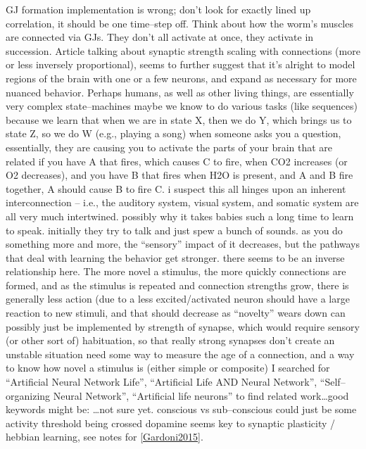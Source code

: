 \documentclass[11pt, a4paper, oneside]{article}   	%
\begin{document}
\begin{outline}
\point GJ formation implementation is wrong; don't look for exactly lined up correlation, it should be one time--step off. Think about how the worm's muscles are connected via GJs. They don't all activate at once, they activate in succession.
\point Article talking about synaptic strength scaling with connections (more or less inversely proportional), seems to further suggest that it's alright to model regions of the brain with one or a few neurons, and expand as necessary for more nuanced behavior.
\point Perhaps humans, as well as other living things, are essentially very complex state--machines
    \subpoint maybe we know to do various tasks (like sequences) because we learn that when we are in state X, then we do Y, which brings us to state Z, so we do W (e.g., playing a song)
\point when someone asks you a question, essentially, they are causing you to activate the parts of your brain that are related 
\point if you have A that fires, which causes C to fire, when CO2 increases (or O2 decreases), and you have B that fires when H2O is present, and A and B fire together, A should cause B to fire C.
    \subpoint i suspect this all hinges upon an inherent interconnection  -- i.e., the auditory system, visual system, and somatic system are all very much intertwined.
        \subsubpoint possibly why it takes babies such a long time to learn to speak. initially they try to talk and just spew a bunch of sounds.
\point as you do something more and more, the ``sensory'' impact of it decreases, but the pathways that deal with learning the behavior get stronger.
    \subpoint there seems to be an inverse relationship here. The more novel a stimulus, the more quickly connections are formed, and as the stimulus is repeated and connection strengths grow, there is generally less action (due to a less excited/activated neuron
        \subsubpoint should have a large reaction to new stimuli, and that should decrease as ``novelty'' wears down
            \supersubpoint can possibly just be implemented by strength of synapse, which would require sensory (or other sort of) habituation, so that really strong synapses don't create an unstable situation
        \subsubpoint need some way to measure the age of a connection, and a way to know how novel a stimulus is (either simple or composite)
\point I searched for ``Artificial Neural Network Life'', ``Artificial Life AND Neural Network'', ``Self--organizing Neural Network'', ``Artificial life neurons'' to find related work\ldots good keywords might be:
    \subpoint \ldots not sure yet.
\point conscious vs sub--conscious could just be some activity threshold being crossed
\point dopamine seems key to synaptic plasticity / hebbian learning, see notes for \ref{Gardoni2015}.
\end{outline}
\end{document}
